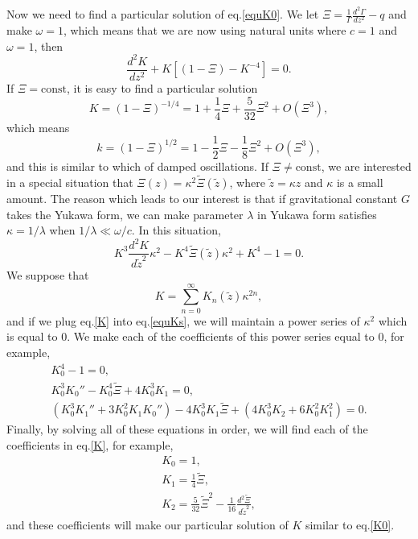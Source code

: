 \documentclass[
    jor,
    amsmath,amssymb,preprint,
    superscriptaddress,
]{revtex4-2}
\begin{document}
Now we need to find a particular solution of eq.\eqref{equK0}. We let $\Xi=\frac{1}{\Gamma}\frac{d^2\Gamma}{d z^2}-q$ and make $\omega=1$, which means that we are now using natural units where $c=1$ and $\omega=1$, then
\begin{equation}\label{equK}
    \frac{d^2 K}{d z^2}+K[(1-\Xi)-K^{-4}]=0.
\end{equation}
If $\Xi=\text{const}$, it is easy to find a particular solution
\begin{equation}\label{K0}
    K=(1-\Xi)^{-1/4}=1+\frac{1}{4}\Xi+\frac{5}{32}\Xi^2+O(\Xi^3),
\end{equation}
which means
\begin{equation}
    k=(1-\Xi)^{1/2}=1-\frac{1}{2}\Xi-\frac{1}{8}\Xi^2+O(\Xi^3),
\end{equation}
and this is similar to which of damped oscillations. If $\Xi\neq\text{const}$, we are interested in a special situation that $\Xi(z)=\kappa^2\tilde{\Xi}(\tilde{z})$, where $\tilde{z}=\kappa z$ and $\kappa$ is a small amount. The reason which leads to our interest is that if gravitational constant $G$ takes the Yukawa form, we can make parameter $\lambda$ in Yukawa form satisfies $\kappa=1/\lambda$ when $1/\lambda\ll\omega/c$. In this situation,
\begin{equation}\label{equKs}
    K^3\frac{d^2 K}{d \tilde{z}^2}\kappa^2-K^4\tilde{\Xi}(\tilde{z})\kappa^2+K^4-1=0.
\end{equation}
We suppose that
\begin{equation}\label{K}
    K=\sum_{n=0}^\infty K_n(\tilde{z})\kappa^{2n},
\end{equation}
and if we plug eq.\eqref{K} into eq.\eqref{equKs}, we will maintain a power series of $\kappa^2$ which is equal to $0$. We make each of the coefficients of this power series equal to $0$, for example,
\begin{gather}
    K_0^4-1=0,\\
    K_0^3K_0''-K_0^4\tilde{\Xi}+4K_0^3K_1=0,\\
    (K_0^3K_1''+3K_0^2K_1K_0'')-4K_0^3K_1\tilde{\Xi}+(4K_0^3K_2+6K_0^2K_1^2)=0.
\end{gather}
Finally, by solving all of these equations in order, we will find each of the coefficients in eq.\eqref{K}, for example,
\begin{gather}
    K_0=1,\\
    K_1=\frac{1}{4}\tilde{\Xi},\\
    K_2=\frac{5}{32}\tilde{\Xi}^2-\frac{1}{16}\frac{d^2\tilde{\Xi}}{d\tilde{z}^2},
\end{gather}
and these coefficients will make our particular solution of $K$ similar to eq.\eqref{K0}.
\end{document}
